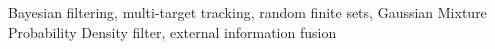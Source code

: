 Bayesian filtering, multi-target tracking, random finite sets, Gaussian Mixture Probability Density filter, external information fusion
